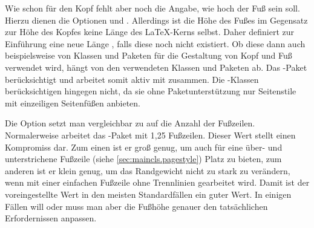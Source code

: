 \begin{Declaration}
\end{Declaration}%
%
Wie schon für den Kopf fehlt aber noch die Angabe, wie hoch der Fuß sein
soll. Hierzu dienen die Optionen  und
. Allerdings ist die
Höhe des Fußes im Gegensatz zur Höhe des Kopfes keine Länge des \LaTeX-Kerns
selbst. Daher definiert  zur Einführung eine neue Länge
, falls diese noch nicht
existiert. Ob diese dann auch beispielsweise von Klassen und Paketen für die
Gestaltung von Kopf und Fuß verwendet wird, hängt von den verwendeten Klassen
und Paketen ab. Das \KOMAScript-Paket
\hyperref[cha:scrlayer-scrpage]{}%
%
 berücksichtigt  und
arbeitet somit aktiv mit  zusammen. Die \KOMAScript-Klassen
berücksichtigen  hingegen nicht, da sie ohne
Paketunterstützung nur Seitenstile mit einzeiligen Seitenfüßen anbieten.

Die Option  setzt man
vergleichbar zu  auf die Anzahl der
Fußzeilen.  Normalerweise arbeitet das -Paket mit 1,25
Fußzeilen. Dieser Wert stellt einen Kompromiss dar. Zum einen ist er groß
genug, um auch für eine über- und unterstrichene Fußzeile (siehe
\autoref{sec:maincls.pagestyle}) Platz zu bieten, zum anderen ist er klein
genug, um das Randgewicht nicht zu stark zu verändern, wenn mit einer
einfachen Fußzeile ohne Trennlinien gearbeitet wird. Damit ist der
voreingestellte Wert in den meisten Standardfällen ein guter Wert.  In einigen
Fällen will oder muss man aber die Fußhöhe genauer den tatsächlichen
Erfordernissen anpassen.

